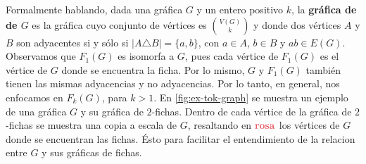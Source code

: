 Formalmente hablando, dada una gr\'afica $G$ y un entero positivo $k$, la
\textbf{gr\'afica de}  \textbf{de
$G$} es la gr\'afica cuyo conjunto de v\'ertices es
$\binom{V(G)}{k}$ y donde dos v\'ertices $A$ y $B$ son adyacentes si y s\'olo si
$|A \triangle B| = \{a,b\}$, con $a \in A$, $b \in B$ y $ab \in E(G)$.
Observamos que $F_1(G)$ es isomorfa a $G$, pues cada v\'ertice de $F_1(G)$ es el
v\'ertice de $G$ donde se encuentra la ficha. Por lo mismo, $G$ y $F_1(G)$
tambi\'en tienen las mismas adyacencias y no adyacencias. Por lo tanto, en
general, nos enfocamos en $F_k(G)$, para $k > 1$. En \cref{fig:ex-tok-graph} se
muestra un ejemplo de una gr\'afica $G$ y su gr\'afica de $2$-fichas. Dentro de
cada v\'ertice de la gr\'afica de $2$-fichas se muestra una copia a escala de
$G$, resaltando en ${\color{rosa}\bf rosa}$ los v\'ertices de $G$ donde se
encuentran las fichas. \'Esto para facilitar el entendimiento de la relacion
entre $G$ y sus gr\'aficas de fichas.

